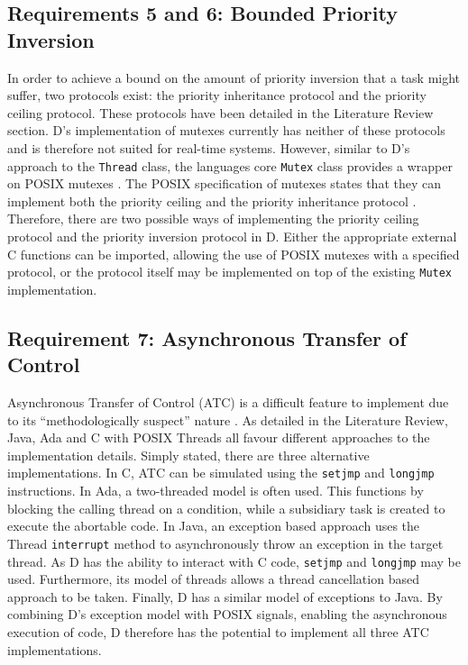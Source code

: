 \subsection{Requirements 5 and 6: Bounded Priority Inversion} %
In order to achieve a bound on the amount of priority inversion that a task
might suffer, two protocols exist: the priority inheritance protocol and the
priority ceiling protocol. These protocols have been detailed in the 
Literature Review section. D's implementation of mutexes currently has
neither of these protocols and is therefore not suited for real-time systems.
However, similar to D's approach to the \texttt{Thread} class, the languages
core \texttt{Mutex} class provides a wrapper on POSIX mutexes
\cite{dlang-github-mutex}. The POSIX specification of mutexes states that
they can implement both the priority ceiling and the priority inheritance protocol 
\cite{mutex-setprotocol}. Therefore, there are two possible ways of
implementing the priority ceiling protocol and the priority inversion protocol
in D. Either the appropriate external C functions can be imported, allowing the
use of POSIX mutexes with a specified protocol, or the protocol itself may be
implemented on top of the existing \texttt{Mutex} implementation. 

\subsection{Requirement 7: Asynchronous Transfer of Control} %
Asynchronous Transfer of Control (ATC) is a difficult feature to implement due to
its ``methodologically suspect'' nature \cite{Brosgol:2002:ATC}. As detailed
in the Literature Review, Java, Ada and C with POSIX Threads all favour
different approaches to the implementation details. Simply stated, there are
three alternative implementations. In C, ATC can be simulated using the
\texttt{setjmp} and \texttt{longjmp} instructions. In Ada, a
two-threaded model is often used. This functions by blocking the calling thread
on a condition, while a subsidiary task is created to execute the abortable
code. In Java, an exception based approach uses the Thread \texttt{interrupt}
method to asynchronously throw an exception in the target thread. As D has the
ability to interact with C code, \texttt{setjmp} and \texttt{longjmp} may be
used. Furthermore, its model of threads allows a thread cancellation based
approach to be taken. Finally, D has a similar model of exceptions to Java. By
combining D's exception model with POSIX signals, enabling the asynchronous
execution of code, D therefore has the potential to implement all three ATC
implementations. 
